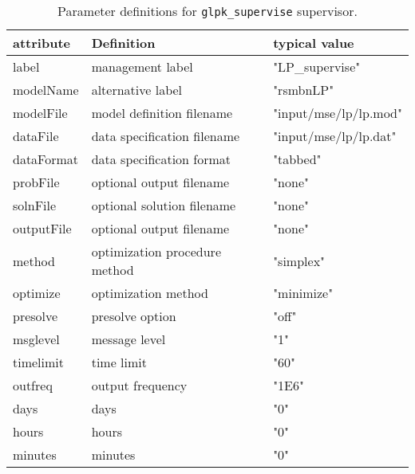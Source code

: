 \begin{table}[!htb]
 \begin{center}
  \footnotesize
  \caption{Parameter definitions for {\tt glpk\_supervise} supervisor. }\label{attrdefs}
  \begin{tabular}{p{2.0cm}p{5.0cm}p{4.0cm}}                            \\[0.8ex]
   attribute  & Definition                    & typical value          \\
   \hline
   label      & management label              & "LP\_supervise"        \\
   modelName  & alternative label             &  "rsmbnLP"             \\ 
   modelFile  & model definition filename     & "input/mse/lp/lp.mod"  \\
   dataFile   & data specification filename   & "input/mse/lp/lp.dat"  \\
   dataFormat & data specification format     & "tabbed"               \\
   probFile   & optional output filename      & "none"                 \\
   solnFile   & optional solution filename    & "none"                 \\ 
   outputFile & optional output filename      & "none"                 \\
   method     & optimization procedure method & "simplex"              \\
   optimize   & optimization method           & "minimize"             \\
   presolve   & presolve option               & "off"                  \\
   msglevel   & message level                 & "1"                    \\
   timelimit  & time limit                    & "60"                   \\
   outfreq    & output frequency              & "1E6"                  \\
   days       & days                          & "0"                    \\ 
   hours      & hours                         & "0"                    \\
   minutes    & minutes                       & "0"                    \\
   \hline
  \end{tabular}
 \end{center}
\end{table}
\normalsize

